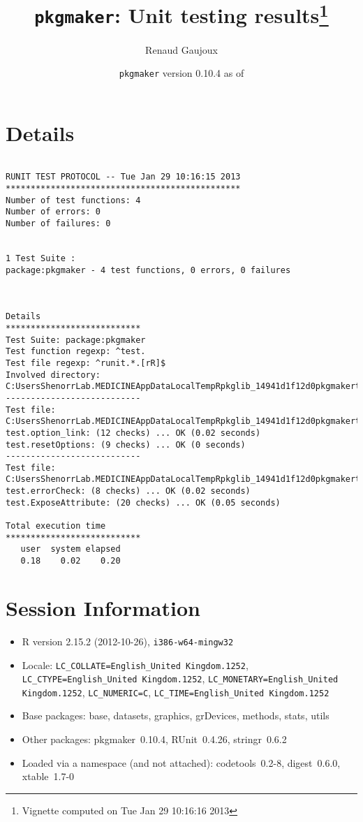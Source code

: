 \documentclass[10pt]{article}
\author{Renaud Gaujoux}
\title{\texttt{pkgmaker}: Unit testing results\footnote{Vignette computed  on Tue Jan 29 10:16:16 2013}}
\date{\texttt{pkgmaker} version 0.10.4 as of }
\begin{document}
\maketitle

\section{Details}
\begin{verbatim}

RUNIT TEST PROTOCOL -- Tue Jan 29 10:16:15 2013 
*********************************************** 
Number of test functions: 4 
Number of errors: 0 
Number of failures: 0 

 
1 Test Suite : 
package:pkgmaker - 4 test functions, 0 errors, 0 failures



Details 
*************************** 
Test Suite: package:pkgmaker 
Test function regexp: ^test. 
Test file regexp: ^runit.*.[rR]$ 
Involved directory: 
C:UsersShenorrLab.MEDICINEAppDataLocalTempRpkglib_14941d1f12d0pkgmakertests 
--------------------------- 
Test file: C:UsersShenorrLab.MEDICINEAppDataLocalTempRpkglib_14941d1f12d0pkgmakertests/runit.options.r 
test.option_link: (12 checks) ... OK (0.02 seconds)
test.resetOptions: (9 checks) ... OK (0 seconds)
--------------------------- 
Test file: C:UsersShenorrLab.MEDICINEAppDataLocalTempRpkglib_14941d1f12d0pkgmakertests/runit.utils.r 
test.errorCheck: (8 checks) ... OK (0.02 seconds)
test.ExposeAttribute: (20 checks) ... OK (0.05 seconds)

Total execution time
***************************
   user  system elapsed 
   0.18    0.02    0.20 

\end{verbatim}

\section*{Session Information}
\begin{itemize}\raggedright
  \item R version 2.15.2 (2012-10-26), \verb|i386-w64-mingw32|
  \item Locale: \verb|LC_COLLATE=English_United Kingdom.1252|, \verb|LC_CTYPE=English_United Kingdom.1252|, \verb|LC_MONETARY=English_United Kingdom.1252|, \verb|LC_NUMERIC=C|, \verb|LC_TIME=English_United Kingdom.1252|
  \item Base packages: base, datasets, graphics, grDevices, methods,
    stats, utils
  \item Other packages: pkgmaker~0.10.4, RUnit~0.4.26, stringr~0.6.2
  \item Loaded via a namespace (and not attached): codetools~0.2-8,
    digest~0.6.0, xtable~1.7-0
\end{itemize}
\end{document}
